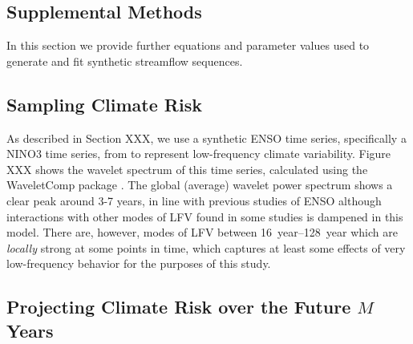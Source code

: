 \documentclass[
      draft,
      ef,
]{agutexSI2019}
\begin{document}
\begin{article}

\renewcommand{\thefigure}{S\arabic{figure}}
\setcounter{figure}{0}
\renewcommand{\theequation}{S\arabic{equation}}
\setcounter{equation}{0}
\renewcommand{\thetable}{S\arabic{table}}
\setcounter{table}{0}

\section{Supplemental Methods}\label{sec:supp-methods}

In this section we provide further equations and parameter values used to generate and fit synthetic streamflow sequences.

\subsection{Sampling Climate Risk}\label{sec:supp-nino-spectrum}

As described in Section XXX, we use a synthetic ENSO time series, specifically a NINO3 time series, from \cite{Ramesh:2016hf} to represent low-frequency climate variability.
Figure XXX shows the wavelet spectrum of this time series, calculated using the WaveletComp package \cite{Roesch:wlBQQoIs}.
The global (average) wavelet power spectrum shows a clear peak around 3-7 years, in line with previous studies of ENSO although interactions with other modes of LFV found in some studies \cite{Jin:1994wq} is dampened in this model.
There are, however, modes of LFV between \SIrange{16}{128}{year} which are \emph{locally} strong at some points in time, which captures at least some effects of very low-frequency behavior for the purposes of this study.

\subsection{Projecting Climate Risk over the Future $M$ Years}


\end{article}
\end{document}
